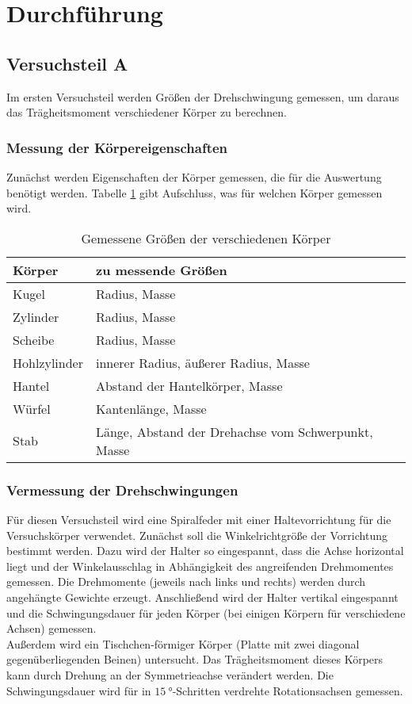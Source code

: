 \section{Durchführung}
\subsection{Versuchsteil A}
Im ersten Versuchsteil werden Größen der Drehschwingung gemessen, um daraus das Trägheitsmoment verschiedener Körper zu berechnen.
\subsubsection{Messung der Körpereigenschaften}
Zunächst werden Eigenschaften der Körper gemessen, die für die Auswertung benötigt werden. Tabelle \ref{tab:1} gibt Aufschluss, was für welchen Körper gemessen wird.
\begin{table}[!htpb]
\begin{tabular}{|l|l|}
\hline 
\textbf{Körper} & \textbf{zu messende Größen} \\ 
\hline 
Kugel & Radius, Masse \\ 
\hline 
Zylinder & Radius, Masse \\ 
\hline 
Scheibe & Radius, Masse \\ 
\hline 
Hohlzylinder & innerer Radius, äußerer Radius, Masse \\ 
\hline 
Hantel & Abstand der Hantelkörper, Masse \\ 
\hline 
Würfel & Kantenlänge, Masse \\ 
\hline 
Stab & Länge, Abstand der Drehachse vom Schwerpunkt, Masse \\ 
\hline 
\end{tabular}
\caption{Gemessene Größen der verschiedenen Körper}
\label{tab:1} 
\end{table}
\subsubsection{Vermessung der Drehschwingungen}
Für diesen Versuchsteil wird eine Spiralfeder mit einer Haltevorrichtung für die Versuchskörper verwendet. Zunächst soll die Winkelrichtgröße der Vorrichtung bestimmt werden. Dazu wird der Halter so eingespannt, dass die Achse horizontal liegt und der Winkelausschlag in Abhängigkeit des angreifenden Drehmomentes gemessen. Die Drehmomente (jeweils nach links und rechts) werden durch angehängte Gewichte erzeugt. Anschließend wird der Halter vertikal eingespannt und die Schwingungsdauer für jeden Körper (bei einigen Körpern für verschiedene Achsen) gemessen.\\
Außerdem wird ein Tischchen-förmiger Körper (Platte mit zwei diagonal gegenüberliegenden Beinen) untersucht. Das Trägheitsmoment dieses Körpers kann durch Drehung an der Symmetrieachse verändert werden. Die Schwingungsdauer wird für in $\SI{15}{\degree}$-Schritten verdrehte Rotationsachsen gemessen.
